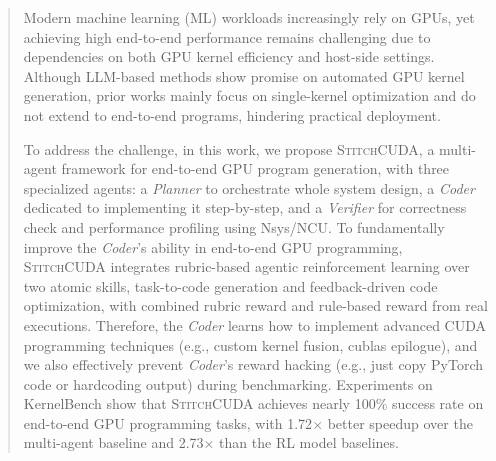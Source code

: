 \documentclass{article}
\theoremstyle{plain}
\theoremstyle{definition}
\theoremstyle{remark}
\begin{document}
\begin{abstract}


Modern machine learning (ML) workloads increasingly rely on GPUs, yet achieving high end-to-end performance remains challenging due to dependencies on both GPU kernel efficiency and host-side settings.
Although LLM-based methods show promise on automated GPU kernel generation, prior works mainly focus on single-kernel optimization and do not extend to end-to-end programs, hindering practical deployment.

To address the challenge, in this work, we propose \textsc{StitchCUDA}, a multi-agent framework for end-to-end GPU program generation, with three specialized agents: a \textit{Planner} to orchestrate whole system design, a \textit{Coder} dedicated to implementing it step-by-step, and a \textit{Verifier} for correctness check and performance profiling using Nsys/NCU. To fundamentally improve the \textit{Coder}'s ability in end-to-end GPU programming, \textsc{StitchCUDA} integrates rubric-based agentic reinforcement learning over two atomic skills, task-to-code generation and feedback-driven code optimization, with combined rubric reward and rule-based reward from real executions. Therefore, the \textit{Coder} learns how to implement advanced CUDA programming techniques (e.g., custom kernel fusion, cublas epilogue), and we also effectively prevent \textit{Coder}'s reward hacking (e.g., just copy PyTorch code or hardcoding output) during benchmarking.
Experiments on KernelBench show that \textsc{StitchCUDA} achieves nearly 100\% success rate on end-to-end GPU programming tasks, with 1.72$\times$  better speedup over the multi-agent baseline and 2.73$\times$ than the RL model baselines. 





\end{abstract}







\end{document}
